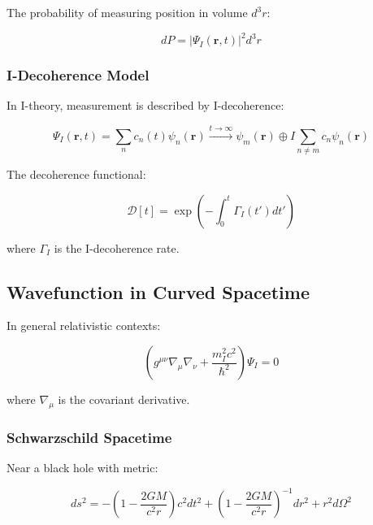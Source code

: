 The probability of measuring position in volume $d^3r$:

\begin{equation}
\label{eq:measurement_probability}
dP = |\Psi_I(\mathbf{r}, t)|^2 d^3r
\end{equation}

\subsubsection{I-Decoherence Model}

In I-theory, measurement is described by I-decoherence:

\begin{equation}
\label{eq:i_decoherence_wavefunction}
\Psi_I(\mathbf{r}, t) = \sum_n c_n(t) \psi_n(\mathbf{r}) \xrightarrow{t\to\infty} \psi_m(\mathbf{r}) \oplus I\sum_{n\neq m} c_n\psi_n(\mathbf{r})
\end{equation}

The decoherence functional:

\begin{equation}
\label{eq:decoherence_functional}
\mathcal{D}[t] = \exp\left(-\int_0^t \Gamma_I(t') dt'\right)
\end{equation}

where $\Gamma_I$ is the I-decoherence rate.

\subsection{Wavefunction in Curved Spacetime}

In general relativistic contexts:

\begin{equation}
\label{eq:curved_spacetime_wavefunction}
\left(g^{\mu\nu}\nabla_\mu\nabla_\nu + \frac{m_I^2c^2}{\hbar^2}\right)\Psi_I = 0
\end{equation}

where $\nabla_\mu$ is the covariant derivative.

\subsubsection{Schwarzschild Spacetime}

Near a black hole with metric:

\begin{equation}
\label{eq:schwarzschild_metric}
ds^2 = -\left(1-\frac{2GM}{c^2r}\right)c^2dt^2 + \left(1-\frac{2GM}{c^2r}\right)^{-1}dr^2 + r^2d\Omega^2
\end{equation}


